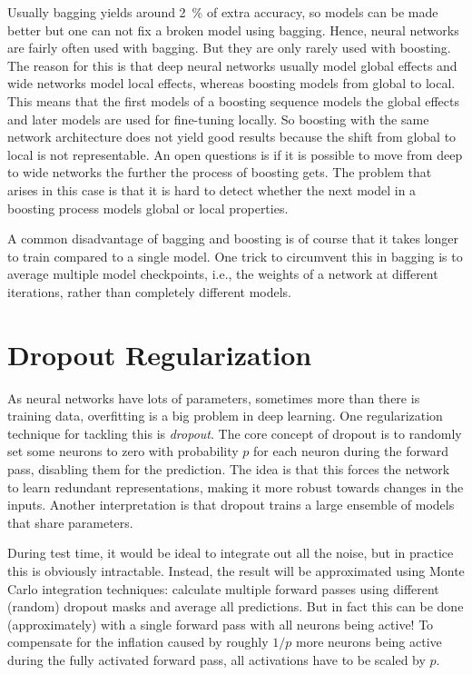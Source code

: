 		Usually bagging yields around \SI{2}{\percent} of extra accuracy, so models can be made better but one can not fix a broken model using bagging. Hence, neural networks are fairly often used with bagging. But they are only rarely used with boosting. The reason for this is that deep neural networks usually model global effects and wide networks model local effects, whereas boosting models from global to local. This means that the first models of a boosting sequence models the global effects and later models are used for fine-tuning locally. So boosting with the same network architecture does not yield good results because the shift from global to local is not representable. An open questions is if it is possible to move from deep to wide networks the further the process of boosting gets. The problem that arises in this case is that it is hard to detect whether the next model in a boosting process models global or local properties.

		A common disadvantage of bagging and boosting is of course that it takes longer to train compared to a single model. One trick to circumvent this in bagging is to average multiple model checkpoints, i.e., the weights of a network at different iterations, rather than completely different models.

	\section{Dropout Regularization}
		As neural networks have lots of parameters, sometimes more than there is training data, overfitting is a big problem in deep learning. One regularization technique for tackling this is \emph{dropout}. The core concept of dropout is to randomly set some neurons to zero with probability \(p\) for each neuron during the forward pass, disabling them for the prediction. The idea is that this forces the network to learn redundant representations, making it more robust towards changes in the inputs. Another interpretation is that dropout trains a large ensemble of models that share parameters.

		During test time, it would be ideal to integrate out all the noise, but in practice this is obviously intractable. Instead, the result will be approximated using Monte Carlo integration techniques: calculate multiple forward passes using different (random) dropout masks and average all predictions. But in fact this can be done (approximately) with a single forward pass with all neurons being active! To compensate for the inflation caused by roughly \(1/p\) more neurons being active during the fully activated forward pass, all activations have to be scaled by \(p\).

